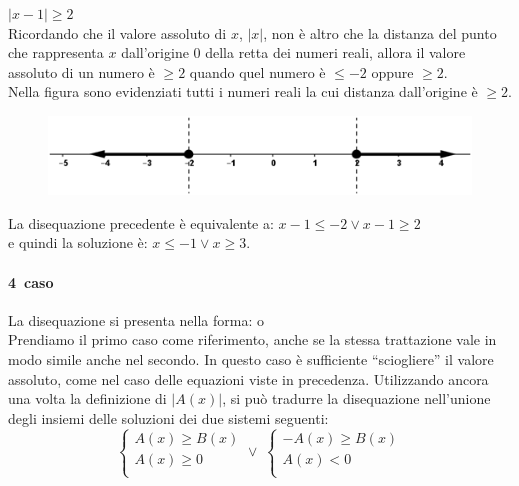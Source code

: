 \begin{esempio} $|x-1|\geq 2$\\[4pt] Ricordando che il valore 
assoluto di $x$, $|x|$, non è altro che la distanza del punto che rappresenta 
$x$ dall'origine 0 della retta dei numeri reali, allora il valore assoluto di 
un numero è $\geq 2$ quando quel numero è $\leq -2$ oppure $\geq 2$.\\
        Nella figura sono evidenziati tutti i numeri reali la cui distanza 
dall'origine è $\geq 2$.
\begin{figure}[h]
\begin{center}
\begin{inaccessibleblock}[TODO]
\centering
\includegraphics[width=0.7\linewidth]{img/imm5} %
\end{inaccessibleblock}
\label{fig:abs_imm5}
\end{center}
\end{figure}
La disequazione precedente è equivalente a: \(x-1\leq -2 \vee x-1 \geq 2\) \\[4pt]
e quindi la soluzione è: \(x\leq -1 \vee x\geq 3.\)
\end{esempio}

\paragraph{4\textdegree~caso} La disequazione si presenta nella forma:  
 o \\[4pt]
Prendiamo il primo caso come riferimento, anche se la stessa trattazione vale in modo simile anche nel secondo.
In questo caso è sufficiente ``sciogliere'' il valore assoluto, come nel caso delle equazioni viste in precedenza.
Utilizzando ancora una volta la definizione di $|A(x)|$, si può tradurre la disequazione
nell'unione degli insiemi delle soluzioni dei due sistemi seguenti:
$$
\left\lbrace 
\begin{array}{l}
A(x)\geq B(x)\\
A(x)\geq 0\\
\end{array}
\right.
\vee \;
\left\lbrace 
\begin{array}{l}
-A(x)\geq B(x)\\
A(x)< 0\\
\end{array}
\right.
$$

